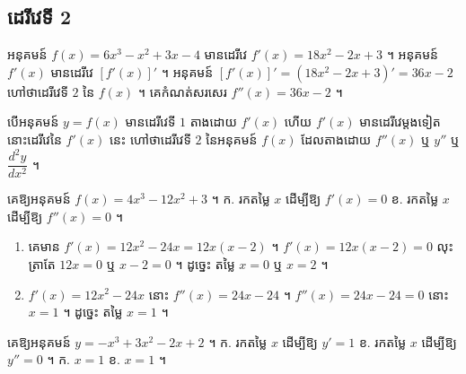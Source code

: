 \subsection{ដេរីវេទី 2}

\begin{example}[ឧទាហរណ៍]
អនុគមន៍ $f(x) = 6x^3 - x^2 + 3x - 4$ មានដេរីវេ $f'(x) = 18x^2 - 2x + 3$ ។ អនុគមន៍ $f'(x)$ មានដេរីវេ $[f'(x)]'$ ។ អនុគមន៍ $[f'(x)]' = (18x^2 - 2x + 3)' = 36x - 2$ ហៅថាដេរីវេទី $2$ នៃ $f(x)$ ។ គេកំណត់សរសេរ $f''(x) = 36x - 2$ ។
\end{example}

\begin{formulaBox}[ជាទូទៅ]
បើអនុគមន៍ $y = f(x)$ មានដេរីវេទី $1$ តាងដោយ $f'(x)$ ហើយ $f'(x)$ មានដេរីវេម្ដងទៀត នោះដេរីវេនៃ $f'(x)$ នេះ ហៅថាដេរីវេទី $2$ នៃអនុគមន៍ $f(x)$ ដែលតាងដោយ $f''(x)$ ឬ $y''$ ឬ $\dfrac{d^2y}{dx^2}$ ។
\end{formulaBox}

\begin{example}[លំហាត់គំរូ]
គេឱ្យអនុគមន៍ $f(x) = 4x^3 - 12x^2 + 3$ ។ \quad ក. រកតម្លៃ $x$ ដើម្បីឱ្យ $f'(x) = 0$ \quad ខ. រកតម្លៃ $x$ ដើម្បីឱ្យ $f''(x) = 0$ ។
\end{example}
\ans
\begin{enumerate}[a]
  \item គេមាន $f'(x) = 12x^2 - 24x = 12x(x - 2)$ ។ $f'(x) = 12x(x - 2) = 0$ លុះត្រាតែ $12x = 0$ ឬ $x - 2 = 0$ ។ ដូច្នេះ តម្លៃ $x = 0$ ឬ $x = 2$ ។
  \item $f'(x) = 12x^2 - 24x$ នោះ $f''(x) = 24x - 24$ ។ $f''(x) = 24x - 24 = 0$ នោះ $x = 1$ ។ ដូច្នេះ តម្លៃ $x = 1$ ។
\end{enumerate}

\begin{pro}
គេឱ្យអនុគមន៍ $y = -x^3 + 3x^2 - 2x + 2$ ។ \quad ក. រកតម្លៃ $x$ ដើម្បីឱ្យ $y' = 1$ \quad ខ. រកតម្លៃ $x$ ដើម្បីឱ្យ $y'' = 0$ ។
\ans
ក. $x = 1$ \quad ខ. $x = 1$ ។
\end{pro}

